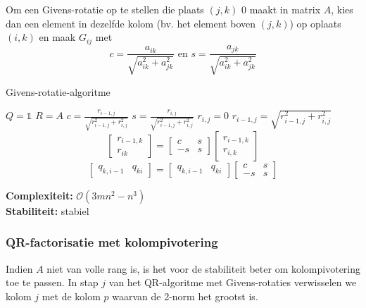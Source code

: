 \documentclass{article}
\begin{document}
	Om een Givens-rotatie op te stellen die plaats $(j,k)$ $0$ maakt in matrix $A$, kies dan een element in dezelfde kolom (bv. het element boven $(j,k)$) op oplaats $(i,k)$ en maak $G_{ij}$ met
	$$ c = \frac{a_{ik}}{\sqrt{a_{ik}^2 + a_{jk}^2}} \text{ en } s = \frac{a_{jk}}{\sqrt{a_{ik}^2 + a_{jk}^2}}$$
	
	\pagebreak
	
	\begin{algorithm}[!ht]
		\caption{Givens-rotatie-algoritme}
		\begin{algorithmic}[1]
				\State $Q=\mathbb{1}$
				\State $R=A$
						\State $c = \frac{r_{i-1,j}}{\sqrt{r_{i-1,j}^2 + r_{i,j}^2}}$
						\State $s = \frac{r_{i,j}}{\sqrt{r_{i-1,j}^2 + r_{i,j}^2}}$
						\State $r_{i,j} = 0$
						\State $r_{i-1,j} = \sqrt{r_{i-1,j}^2 + r_{i,j}^2}$
							\State 
							$$
								\begin{bmatrix}
									r_{i-1,k} \\
									r_{ik}
								\end{bmatrix}
								=
								\begin{bmatrix}
									c & s \\
									-s & s
								\end{bmatrix}
								\begin{bmatrix}
									r_{i-1,k} \\
									r_{i,k}
								\end{bmatrix}
							$$
						\EndFor
							\State
							$$
								\begin{bmatrix}
									q_{k,i-1} & q_{ki}
								\end{bmatrix}
								=
								\begin{bmatrix}
									q_{k,i-1} & q_{ki}
								\end{bmatrix}
								\begin{bmatrix}
									c & s \\
									-s & s
								\end{bmatrix}
							$$
						\EndFor
					\EndFor
				\EndFor
			\EndProcedure
		\end{algorithmic}
	\end{algorithm}

	\textbf{Complexiteit:} $\mathcal{O}(3mn^2 - n^3)$ \\
	\textbf{Stabiliteit:} stabiel


	
	\subsubsection{QR-factorisatie met kolompivotering}
	Indien $A$ niet van volle rang is, is het voor de stabiliteit beter om kolompivotering toe te passen. In stap $j$ van het QR-algoritme met Givens-rotaties verwisselen we kolom $j$ met de kolom $p$ waarvan de 2-norm het grootst is.\\
		
\end{document}

